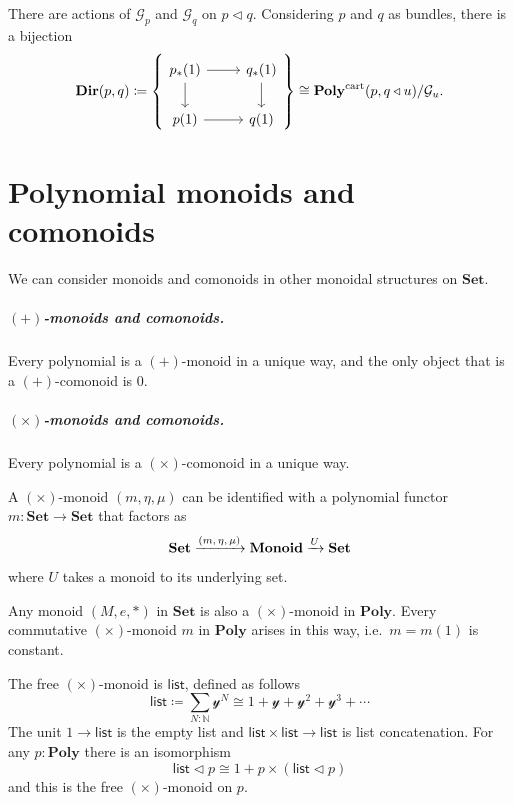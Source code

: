 \documentclass[11pt, one side, article]{memoir}
\theoremstyle{definition}
\theoremstyle{plain}
\newcommand{\cat}[1]{\mathcal{#1}}%
\newcommand{\Cat}[1]{\mathbf{#1}}%
\newcommand{\Fun}[1]{\mathsf{#1}}%
\newcommand{\To}[2][]{\xrightarrow[#1]{\tn{$#2$}}}
\newcommand{\tn}[1]{\textnormal{#1}}
\newcommand{\nn}{\mathbb{N}}
\newcommand{\smset}{\Cat{Set}}
\newcommand{\List}{\Fun{list}}
\newcommand{\yon}{{\mathcal{y}}}
\newcommand{\poly}{\Cat{Poly}}
\newcommand{\cart}{\tn{cart}}
\newcommand{\polycart}{\poly^\cart}
\newcommand{\0}{\textsf{0}}
\newcommand{\1}{\tn{\textsf{1}}}
\newcommand{\tri}{\mathbin{\triangleleft}}
\begin{document}
There are actions of $\cat{G}_p$ and $\cat{G}_q$ on $p\tri q$. Considering $p$ and $q$ as bundles, there is a bijection
\begin{equation}
	\Cat{Dir}(p,q)\coloneqq\left\{
	\begin{tikzcd}[ampersand replacement=\&]
		p_*(1)\ar[r]\ar[d]\&q_*(1)\ar[d]\\
		p(1)\ar[r]\&q(1)
	\end{tikzcd}
	\right\}
	\cong
	\polycart(p,q\tri u)/\cat{G}_u.
\end{equation}


\chapter{Polynomial monoids and comonoids}\label{chap.monoids.comonoids}

We can consider monoids and comonoids in other monoidal structures on $\smset$. 

\paragraph{$(+)$-monoids and comonoids.}
Every polynomial is a $(+)$-monoid in a unique way, and the only object that is a $(+)$-comonoid is $0$.

\paragraph{$(\times)$-monoids and comonoids.}
Every polynomial is a $(\times)$-comonoid in a unique way.

A $(\times)$-monoid $(m,\eta,\mu)$ can be identified with a polynomial functor $m\colon\smset\to\smset$ that factors as
\begin{equation}
	\smset\To{(m,\eta,\mu)}\Cat{Monoid}\To{U}\smset
\end{equation}
where $U$ takes a monoid to its underlying set.

Any monoid $(M,e,*)$ in $\smset$ is also a $(\times)$-monoid in $\poly$. Every commutative $(\times)$-monoid $m$ in $\poly$ arises in this way, i.e.\ $m=m(1)$ is constant.

The free $(\times)$-monoid is $\List$, defined as follows
\begin{equation}\label{eqn.list}
\List\coloneqq\sum_{N:\nn}\yon^N\cong 1+\yon+\yon^2+\yon^3+\cdots
\end{equation}
The unit $1\to\List$ is the empty list and $\List\times\List\to\List$ is list concatenation. For any $p:\poly$ there is an isomorphism
\begin{equation}\label{eqn.unfolding_list}
\List\tri p\cong 1+p\times(\List\tri p)
\end{equation}
and this is the free $(\times)$-monoid on $p$.
\end{document}
